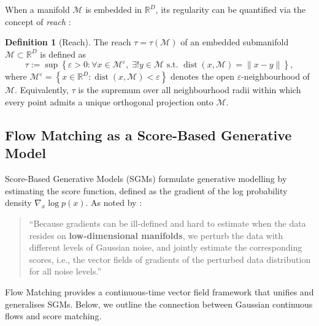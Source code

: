 \documentclass{article}
\theoremstyle{plain}
\theoremstyle{definition}
\newtheorem{definition}[theorem]{Definition}
\theoremstyle{remark}
\begin{document}
When a manifold $\mathcal{M}$ is embedded in $\mathbb{R}^D$, its regularity can be quantified via the concept of \emph{reach} \citep{federer1959curvature}:

\begin{definition}[Reach]
The reach $\tau = \tau(\mathcal{M})$ of an embedded submanifold $\mathcal{M} \subset \mathbb{R}^D$ is defined as
\[
\tau := \sup \left\{ \varepsilon > 0 : \forall x \in \mathcal{M}^{\varepsilon}, \; \exists! y \in \mathcal{M} \text{ s.t. } \operatorname{dist}(x, \mathcal{M}) = \|x - y\| \right\},
\]
where $\mathcal{M}^{\varepsilon} = \left\{ x \in \mathbb{R}^D : \operatorname{dist}(x, \mathcal{M}) < \varepsilon \right\}$ denotes the open $\varepsilon$-neighbourhood of $\mathcal{M}$. Equivalently, $\tau$ is the supremum over all neighbourhood radii within which every point admits a unique orthogonal projection onto $\mathcal{M}$.
\end{definition}

\subsection{Flow Matching as a Score-Based Generative Model}

Score-Based Generative Models (SGMs) \citep{ho2020denoising, song2019generative, song2020score} formulate generative modelling by estimating the score function, defined as the gradient of the log probability density $\nabla_x \log p(x)$. As noted by \citet{song2019generative}:
\begin{quote}
``Because gradients can be ill-defined and hard to estimate when the data resides on \textbf{low-dimensional manifolds}, we perturb the data with different levels of Gaussian noise, and jointly estimate the corresponding scores, i.e., the vector fields of gradients of the perturbed data distribution for all noise levels.''
\end{quote}

Flow Matching \citep{lipman2022flow, albergo2025stochastic} provides a continuous-time vector field framework that unifies and generalises SGMs. Below, we outline the connection between Gaussian continuous flows and score matching.
\end{document}
